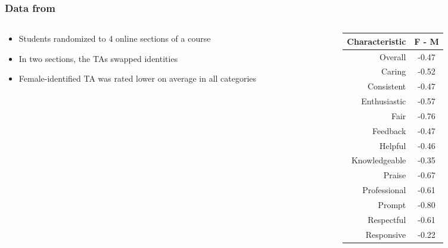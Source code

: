 \documentclass{beamer}
\begin{document}
\frame
{
  \frametitle{Data from \cite{MacNell2014}}
\begin{columns}[T]
\begin{column}{.5\textwidth}
\begin{center}
\begin{itemize}
\itemsep 15pt
\item Students randomized to 4 online sections of a course
\item In two sections, the TAs swapped identities
\item Female-identified TA was rated lower on average in all categories
\end{itemize}
\end{center}
\end{column}
\begin{column}{.5\textwidth}
\begin{table}
\begin{tabular}{r|c}
\textbf{Characteristic} & \textbf{F - M} \\
\hline
Overall & -0.47 \\
Caring & -0.52 \\
Consistent & -0.47 \\
Enthusiastic & -0.57 \\
Fair & -0.76 \\
Feedback & -0.47 \\
Helpful & -0.46 \\
Knowledgeable & -0.35 \\
Praise & -0.67 \\
Professional & -0.61 \\
Prompt & -0.80 \\
Respectful & -0.61 \\
Responsive & -0.22
\end{tabular}
\end{table}
\end{column}
\end{columns}
}



\end{document}
